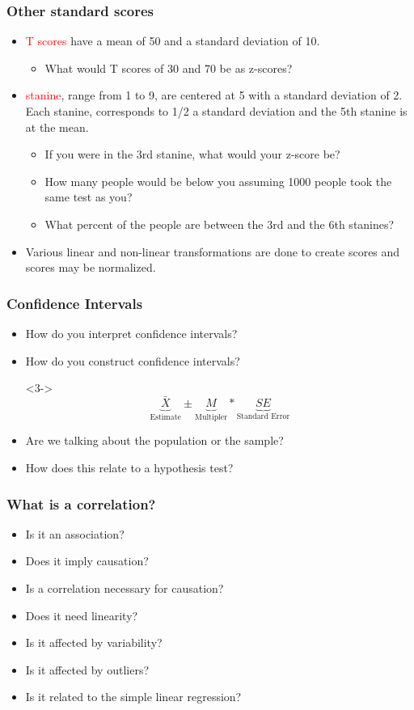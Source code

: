 \documentclass[dvipsnames]{beamer}\usepackage[]{graphicx}\usepackage[]{color}
\begin{document}
\begin{frame}
\frametitle{Other standard scores}
\begin{itemize}
  \item<1-> \textcolor{red}{T scores} have a mean of 50 and a standard deviation of 10.
    \begin{itemize}
      \item<2-> What would T scores of 30 and 70 be as z-scores?
    \end{itemize}
    \item<3-> \textcolor{red}{stanine}, range from 1 to 9, are centered at 5 with a standard deviation of 2. Each stanine, corresponds to 1/2 a standard deviation and the 5th stanine is at the mean.
      \begin{itemize}
        \item<4-> If you were in the 3rd stanine, what would your z-score be?
        \item<5-> How many people would be below you assuming 1000 people took the same test as you?
        \item<6-> What percent of the people are between the 3rd and the 6th stanines?
      \end{itemize}
      \item<7-> Various linear and non-linear transformations are done to create scores and scores may be normalized.
\end{itemize}
\end{frame}

\begin{frame}
\frametitle{Confidence Intervals}
\begin{itemize}
\item<1-> How do you interpret confidence intervals?
\item<2-> How do you construct confidence intervals?

\item[]<3->$$
\underbrace{\bar{X}}_{\text{Estimate}} \pm \underbrace{M}_{\text{Multipler}} * \underbrace{SE}_{\text{Standard Error}}
$$
\item<4-> Are we talking about the population or the sample?
\item<5-> How does this relate to a hypothesis test?
\end{itemize}
\end{frame}

\begin{frame}
\frametitle{What is a correlation?}
\begin{itemize}
  \item Is it an association?
  \item Does it imply causation?
  \item Is a correlation necessary for causation?
  \item Does it need linearity?
  \item Is it affected by variability?
  \item Is it affected by outliers?
  \item Is it related to the simple linear regression?
\end{itemize}
\end{frame}
\end{document}
